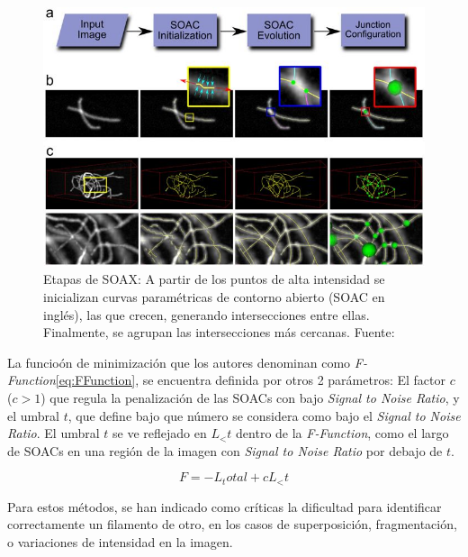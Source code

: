 \begin{figure}[h]
        \centering
        \includegraphics[scale=0.75]{imagenes/SOAX.jpg}
        \caption{Etapas de SOAX: A partir de los puntos de alta intensidad se inicializan curvas param\'etricas de contorno abierto (SOAC en ingl\'es), las que crecen, generando intersecciones entre ellas. Finalmente, se agrupan las intersecciones más cercanas. Fuente: \cite{xu2015soax}}
        \label{fig:SOAX}
\end{figure}

La funcio\'on de minimizaci\'on que los autores denominan como  \textit{F-Function}\eqref{eq:FFunction}, se encuentra definida por otros 2 par\'ametros: El factor $c$ ($c > 1$) que regula la penalizaci\'on de las SOACs con bajo \textit{Signal to Noise Ratio}, y el umbral $t$, que define bajo que n\'umero se considera como bajo el \textit{Signal to Noise Ratio}. El umbral $t$ se ve reflejado en $L_<t$ dentro de la \textit{F-Function}, como el largo de SOACs en una regi\'on de la imagen con \textit{Signal to Noise Ratio} por debajo de $t$.

\begin{equation}
   \label{eq:FFunction}
    F = -L_total + {c}{L_<t} 
\end{equation}

Para estos m\'etodos, se han indicado como cr\'iticas la dificultad para identificar correctamente un filamento de otro, en los casos de  superposici\'on, fragmentaci\'on, o variaciones de intensidad en la imagen.

